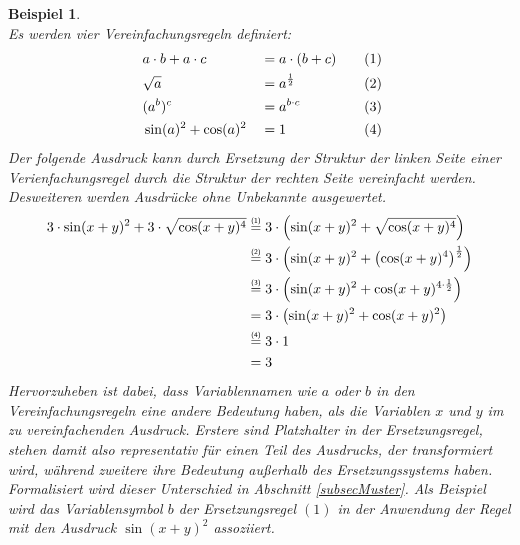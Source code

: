 \newtheorem{bsp}{Beispiel}[section]
\begin{bsp}~\\
Es werden vier Vereinfachungsregeln definiert:
\begin{alignat*}{4}
    ~& a \cdot b + a \cdot c & &= a \cdot (b + c) &~~~& (1) \\
    ~& \sqrt{a}              & &= a^{\frac 1 2}   &~~~& (2) \\
    ~& (a^b)^c         & &= a^{b \cdot c}   &~~~& (3) \\
    ~& \sin(a)^2 + \cos(a)^2 & &= 1               &~~~& (4)
\end{alignat*}
Der folgende Ausdruck kann durch Ersetzung der Struktur der linken Seite einer Verienfachungsregel durch die Struktur der rechten Seite vereinfacht werden. Desweiteren werden Ausdrücke ohne Unbekannte ausgewertet.
\begin{equation*}
    \begin{split}
	3 \cdot \sin(x + y)^2 + 3 \cdot \sqrt{\cos(x + y)^4}
	&\stapel = {(1)} 3 \cdot \paren*{\sin(x + y)^2 + \sqrt{\cos(x + y)^4}} \\
	&\stapel = {(2)} 3 \cdot \paren*{\sin(x + y)^2 + \paren*{{\cos(x + y)^4}}^{\frac 1 2}}\\
	&\stapel = {(3)} 3 \cdot \paren*{\sin(x + y)^2 + {\cos(x + y)^{4 \cdot \frac 1 2}}}\\
	& =              3 \cdot \paren*{\sin(x + y)^2 + {\cos(x + y)^2}}\\
	&\stapel = {(4)} 3 \cdot 1\\
    & = 3
    \end{split}
\end{equation*}
Hervorzuheben ist dabei, dass Variablennamen wie $a$ oder $b$ in den Vereinfachungsregeln eine andere Bedeutung haben, als die Variablen $x$ und $y$ im zu vereinfachenden Ausdruck. Erstere sind Platzhalter in der Ersetzungsregel, stehen damit also representativ für einen Teil des Ausdrucks, der transformiert wird, während zweitere ihre Bedeutung außerhalb des Ersetzungssystems haben. Formalisiert wird dieser Unterschied in Abschnitt \ref{subsecMuster}. Als Beispiel wird das Variablensymbol $b$ der Ersetzungsregel $(1)$ in der Anwendung der Regel mit den Ausdruck $\sin(x + y)^2$ assoziiert. 
\end{bsp}

